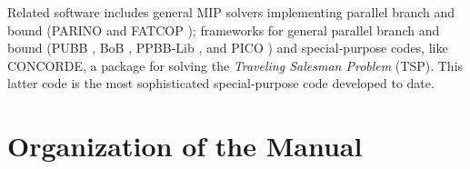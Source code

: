 Related software includes general MIP solvers implementing
parallel branch and bound (PARINO \cite{W:parino} and FATCOP
\cite{W:fatcop}); frameworks for general parallel branch and 
bound (PUBB \cite{W:pubb}, BoB \cite{W:bob}, PPBB-Lib
\cite{W:ppbb-lib}, and PICO \cite{W:pico}) and special-purpose codes, like 
CONCORDE, a package for solving the {\em Traveling Salesman Problem}
(TSP). This latter code is the  most sophisticated special-purpose
code developed to date.





\section{Organization of the Manual}

